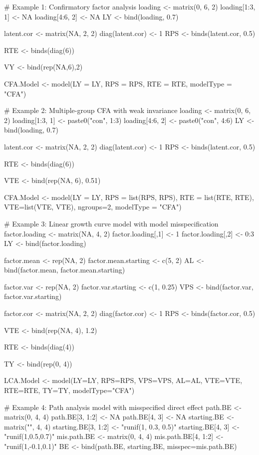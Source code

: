 \documentclass[a4paper]{book}
\begin{document}
%
\begin{Examples}
\begin{ExampleCode}
# Example 1: Confirmatory factor analysis
loading <- matrix(0, 6, 2)
loading[1:3, 1] <- NA
loading[4:6, 2] <- NA
LY <- bind(loading, 0.7)

latent.cor <- matrix(NA, 2, 2)
diag(latent.cor) <- 1
RPS <- binds(latent.cor, 0.5)

RTE <- binds(diag(6))

VY <- bind(rep(NA,6),2)

CFA.Model <- model(LY = LY, RPS = RPS, RTE = RTE, modelType = "CFA")

# Example 2: Multiple-group CFA with weak invariance
loading <- matrix(0, 6, 2)
loading[1:3, 1] <- paste0("con", 1:3)
loading[4:6, 2] <- paste0("con", 4:6)
LY <- bind(loading, 0.7)

latent.cor <- matrix(NA, 2, 2)
diag(latent.cor) <- 1
RPS <- binds(latent.cor, 0.5)

RTE <- binds(diag(6))

VTE <- bind(rep(NA, 6), 0.51)

CFA.Model <- model(LY = LY, RPS = list(RPS, RPS), RTE = list(RTE, RTE), VTE=list(VTE, VTE), 
	ngroups=2, modelType = "CFA")

# Example 3: Linear growth curve model with model misspecification
factor.loading <- matrix(NA, 4, 2)
factor.loading[,1] <- 1
factor.loading[,2] <- 0:3
LY <- bind(factor.loading)

factor.mean <- rep(NA, 2)
factor.mean.starting <- c(5, 2)
AL <- bind(factor.mean, factor.mean.starting)

factor.var <- rep(NA, 2)
factor.var.starting <- c(1, 0.25)
VPS <- bind(factor.var, factor.var.starting)

factor.cor <- matrix(NA, 2, 2)
diag(factor.cor) <- 1
RPS <- binds(factor.cor, 0.5)

VTE <- bind(rep(NA, 4), 1.2)

RTE <- binds(diag(4))

TY <- bind(rep(0, 4))

LCA.Model <- model(LY=LY, RPS=RPS, VPS=VPS, AL=AL, VTE=VTE, RTE=RTE, TY=TY, modelType="CFA")

# Example 4: Path analysis model with misspecified direct effect
path.BE <- matrix(0, 4, 4)
path.BE[3, 1:2] <- NA
path.BE[4, 3] <- NA
starting.BE <- matrix("", 4, 4)
starting.BE[3, 1:2] <- "runif(1, 0.3, 0.5)"
starting.BE[4, 3] <- "runif(1,0.5,0.7)"
mis.path.BE <- matrix(0, 4, 4)
mis.path.BE[4, 1:2] <- "runif(1,-0.1,0.1)"
BE <- bind(path.BE, starting.BE, misspec=mis.path.BE)


\end{ExampleCode}
\end{Examples}
\end{document}
